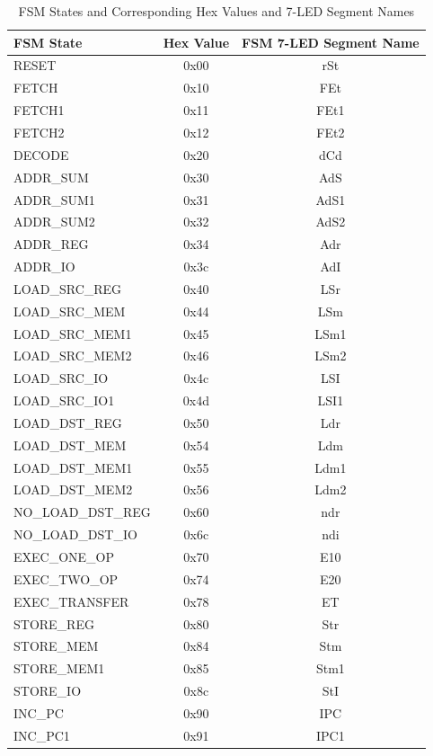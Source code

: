 \documentclass{article}
\begin{document}
\begin{table}[h!]
    \centering
    \begin{tabular}{|l|c|c|}
        \hline
        \textbf{FSM State} & \textbf{Hex Value} & \textbf{FSM 7-LED Segment Name} \\
        \hline
        RESET & 0x00 & rSt \\
        \hline
        FETCH & 0x10 & FEt \\
        \hline
        FETCH1 & 0x11 & FEt1 \\
        \hline
        FETCH2 & 0x12 & FEt2 \\
        \hline
        DECODE & 0x20 & dCd \\
        \hline
        ADDR\_SUM & 0x30 & AdS \\
        \hline
        ADDR\_SUM1 & 0x31 & AdS1 \\
        \hline
        ADDR\_SUM2 & 0x32 & AdS2 \\
        \hline
        ADDR\_REG & 0x34 & Adr \\
        \hline
        ADDR\_IO & 0x3c & AdI \\
        \hline
        LOAD\_SRC\_REG & 0x40 & LSr \\
        \hline
        LOAD\_SRC\_MEM & 0x44 & LSm \\
        \hline
        LOAD\_SRC\_MEM1 & 0x45 & LSm1 \\
        \hline
        LOAD\_SRC\_MEM2 & 0x46 & LSm2 \\
        \hline
        LOAD\_SRC\_IO & 0x4c & LSI \\
        \hline
        LOAD\_SRC\_IO1 & 0x4d & LSI1 \\
        \hline
        LOAD\_DST\_REG & 0x50 & Ldr \\
        \hline
        LOAD\_DST\_MEM & 0x54 & Ldm \\
        \hline
        LOAD\_DST\_MEM1 & 0x55 & Ldm1 \\
        \hline
        LOAD\_DST\_MEM2 & 0x56 & Ldm2 \\
        \hline
        NO\_LOAD\_DST\_REG & 0x60 & ndr \\
        \hline
        NO\_LOAD\_DST\_IO & 0x6c & ndi \\
        \hline
        EXEC\_ONE\_OP & 0x70 & E10 \\
        \hline
        EXEC\_TWO\_OP & 0x74 & E20 \\
        \hline
        EXEC\_TRANSFER & 0x78 & ET \\
        \hline
        STORE\_REG & 0x80 & Str \\
        \hline
        STORE\_MEM & 0x84 & Stm \\
        \hline
        STORE\_MEM1 & 0x85 & Stm1 \\
        \hline
        STORE\_IO & 0x8c & StI \\
        \hline
        INC\_PC & 0x90 & IPC \\
        \hline
        INC\_PC1 & 0x91 & IPC1 \\
        \hline
    \end{tabular}
    \caption{FSM States and Corresponding Hex Values and 7-LED Segment Names}
    \label{tab:fsm_states}
\end{table}
\end{document}

